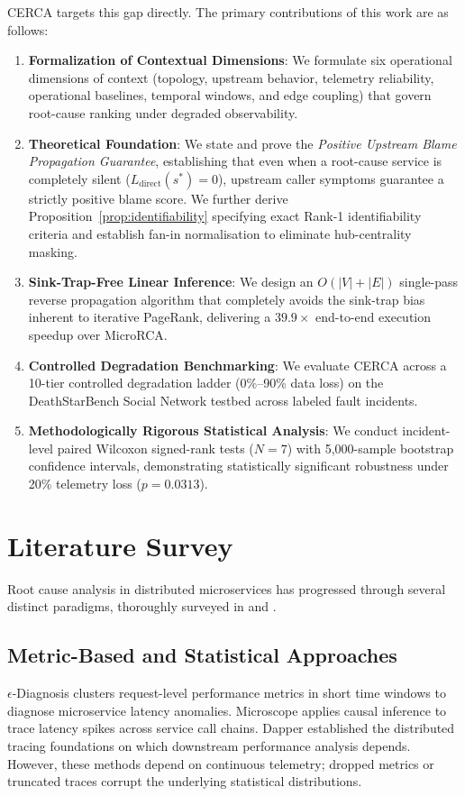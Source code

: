 \documentclass[conference]{IEEEtran}
\begin{document}
CERCA targets this gap directly. The primary contributions of this work are as follows:
\begin{enumerate}
    \item \textbf{Formalization of Contextual Dimensions}: We formulate six operational dimensions of context (topology, upstream behavior, telemetry reliability, operational baselines, temporal windows, and edge coupling) that govern root-cause ranking under degraded observability.
    \item \textbf{Theoretical Foundation}: We state and prove the \textit{Positive Upstream Blame Propagation Guarantee}, establishing that even when a root-cause service is completely silent ($L_{\mathrm{direct}}(s^*)=0$), upstream caller symptoms guarantee a strictly positive blame score. We further derive Proposition~\ref{prop:identifiability} specifying exact Rank-1 identifiability criteria and establish fan-in normalisation to eliminate hub-centrality masking.
    \item \textbf{Sink-Trap-Free Linear Inference}: We design an $O(|V|+|E|)$ single-pass reverse propagation algorithm that completely avoids the sink-trap bias inherent to iterative PageRank, delivering a $39.9\times$ end-to-end execution speedup over MicroRCA.
    \item \textbf{Controlled Degradation Benchmarking}: We evaluate CERCA across a 10-tier controlled degradation ladder (0\%--90\% data loss) on the DeathStarBench Social Network testbed across labeled fault incidents.
    \item \textbf{Methodologically Rigorous Statistical Analysis}: We conduct incident-level paired Wilcoxon signed-rank tests ($N=7$) with 5{,}000-sample bootstrap confidence intervals, demonstrating statistically significant robustness under 20\% telemetry loss ($p=0.0313$).
\end{enumerate}

\section{Literature Survey}

Root cause analysis in distributed microservices has progressed through several distinct paradigms, thoroughly surveyed in \cite{zhang2024survey} and \cite{nguyen2022}.

\subsection{Metric-Based and Statistical Approaches}
$\epsilon$-Diagnosis \cite{shan2019} clusters request-level performance metrics in short time windows to diagnose microservice latency anomalies. Microscope \cite{lin2018} applies causal inference to trace latency spikes across service call chains. Dapper \cite{sigelman2010} established the distributed tracing foundations on which downstream performance analysis depends. However, these methods depend on continuous telemetry; dropped metrics or truncated traces corrupt the underlying statistical distributions.
\end{document}
